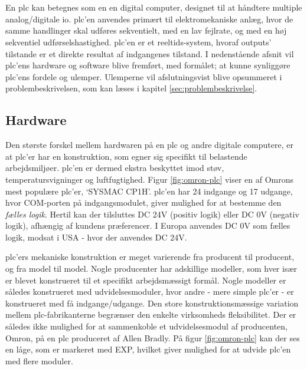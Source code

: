 \section{}
En \gls{plc} kan betegnes som en en digital computer, designet til at håndtere multiple analog/digitale \gls{io}. \gls{plc}'en anvendes primært til elektromekaniske anlæg, hvor de samme handlinger skal udføres sekventielt, med en lav fejlrate, og med en høj sekventiel udførselshastighed. \gls{plc}'en er et reeltids-system, hvoraf outputs' tilstande er et direkte resultat af indgangenes tilstand. I nedenstående afsnit vil \gls{plc}'ens hardware og software blive fremført, med formålet; at kunne synliggøre \gls{plc}'ens fordele og ulemper. Ulemperne vil afslutningsvist blive opsummeret i problembeskrivelsen, som kan læses i kapitel \ref{sec:problembeskrivelse}. \cite{PLC_hardware_desc}

\subsection{Hardware}
Den største forskel mellem hardwaren på en \gls{plc} og andre digitale computere, er at \gls{plc}'er har en konstruktion, som egner sig specifikt til belastende arbejdsmiljøer. \gls{plc}'en er dermed ekstra beskyttet imod støv, temperatursvigninger og luftfugtighed. Figur \ref{fig:omron-plc} viser en af Omrons mest populære \gls{plc}'er, \enquote*{SYSMAC CP1H}. \gls{plc}'en har 24 indgange og 17 udgange, hvor COM-porten på indgangsmodulet, giver mulighed for at bestemme den \textit{fælles logik}. Hertil kan der tilsluttes DC 24V (positiv logik) eller DC 0V (negativ logik), afhængig af kundens præferencer. I Europa anvendes DC 0V som fælles logik, modsat i USA - hvor der anvendes DC 24V. 


\noindent \gls{plc}'ers mekaniske konstruktion er meget varierende fra producent til producent, og fra model til model. Nogle producenter har adskillige modeller, som hver især er blevet konstrueret til et specifikt arbejdsmæssigt formål. Nogle modeller er således konstrueret med udvidelsesmoduler, hvor andre - mere simple \gls{plc}'er - er konstrueret med få indgange/udgange. 
Den store konstruktionsmæssige variation mellem \gls{plc}-fabrikanterne begrænser den enkelte virksomheds fleksibilitet. Der er således ikke mulighed for at sammenkoble et udvidelsesmodul af producenten, Omron, på en \gls{plc} produceret af Allen Bradly\cite{PLC-comb}. På figur \ref{fig:omron-plc} kan der ses en låge, som er markeret med EXP, hvilket giver mulighed for at udvide \gls{plc}'en med flere moduler.

